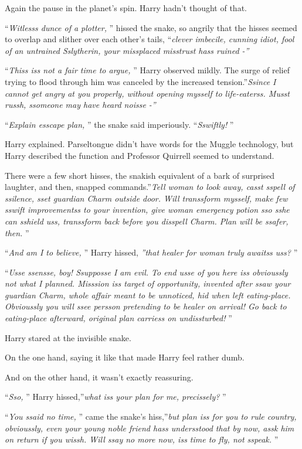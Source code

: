 Again the pause in the planet's spin. Harry hadn't thought of that.

``\emph{Witlesss dunce of a plotter,} '' hissed the snake, so angrily that
the hisses seemed to overlap and slither over each other's tails,
``\emph{clever imbecile, cunning idiot, fool of an untrained Sslytherin,
your missplaced misstrust hass ruined -''}

``\emph{Thiss iss not a fair time to argue,} '' Harry observed mildly. The
surge of relief trying to flood through him was canceled by the
increased tension.''\emph{Ssince I cannot get angry at you properly,
without opening mysself to life-eaterss. Musst russh, ssomeone may have
heard noisse -''}

``\emph{Explain esscape plan,} '' the snake said imperiously.
``\emph{Sswiftly!} ''

Harry explained. Parseltongue didn't have words for the Muggle
technology, but Harry described the function and Professor Quirrell
seemed to understand.

There were a few short hisses, the snakish equivalent of a bark of
surprised laughter, and then, snapped commands.''\emph{Tell woman to
look away, casst sspell of ssilence, sset guardian Charm outside door.
Will transsform mysself, make few sswift improvementss to your
invention, give woman emergency potion sso sshe can sshield uss,
transsform back before you disspell Charm. Plan will be ssafer, then.} ''

``\emph{And am I to believe,} '' Harry hissed, \emph{''that healer for
woman truly awaitss uss?} ''

``\emph{Usse ssensse, boy! Ssupposse I am evil. To end usse of you here
iss obvioussly not what I planned. Misssion iss target of opportunity,
invented after ssaw your guardian Charm, whole affair meant to be
unnoticed, hid when left eating-place. Obvioussly you will ssee persson
pretending to be healer on arrival! Go back to eating-place afterward,
original plan carriess on undissturbed!} ''

Harry stared at the invisible snake.

On the one hand, saying it like that made Harry feel rather dumb.

And on the other hand, it wasn't exactly reassuring.

``\emph{Sso,} '' Harry hissed,''\emph{what iss your plan for me,
precissely?} ''

``\emph{You ssaid no time,} '' came the snake's hiss,''\emph{but plan iss
for you to rule country, obvioussly, even your young noble friend hass
undersstood that by now, assk him on return if you wissh. Will ssay no
more now, iss time to fly, not sspeak.} ''

